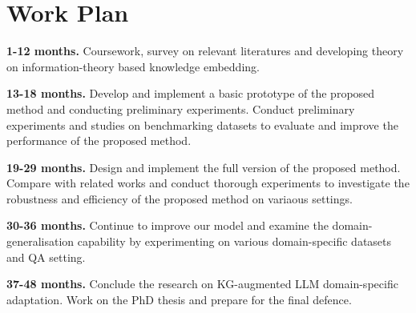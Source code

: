 \section*{Work Plan}

\textbf{1-12 months. }
Coursework, survey on relevant literatures and developing theory on information-theory based knowledge embedding.

\textbf{13-18 months. }
Develop and implement a basic prototype of the proposed method and conducting preliminary experiments.
Conduct preliminary experiments and studies on benchmarking datasets to evaluate and improve the performance of the proposed method.

\textbf{19-29 months. }
Design and implement the full version of the proposed method. 
Compare with related works and conduct thorough experiments to investigate the robustness and efficiency of the proposed method on variaous settings.

\textbf{30-36 months. }
Continue to improve our model and examine the domain-generalisation capability by experimenting on various domain-specific datasets and QA setting.

\textbf{37-48 months. }
Conclude the research on KG-augmented LLM domain-specific adaptation. 
Work on the PhD thesis and prepare for the final defence.
